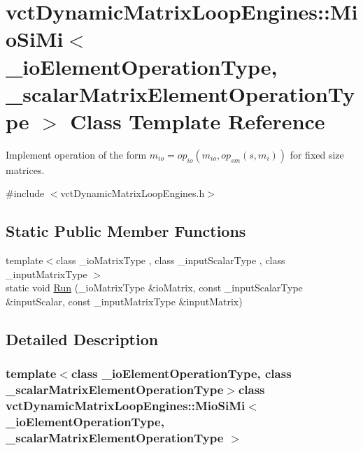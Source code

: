 \hypertarget{classvct_dynamic_matrix_loop_engines_1_1_mio_si_mi}{\section{vct\-Dynamic\-Matrix\-Loop\-Engines\-:\-:Mio\-Si\-Mi$<$ \-\_\-io\-Element\-Operation\-Type, \-\_\-scalar\-Matrix\-Element\-Operation\-Type $>$ Class Template Reference}
\label{classvct_dynamic_matrix_loop_engines_1_1_mio_si_mi}
}


Implement operation of the form $m_{io} = op_{io}(m_{io}, op_{sm}(s, m_i))$ for fixed size matrices.  




{\ttfamily \#include $<$vct\-Dynamic\-Matrix\-Loop\-Engines.\-h$>$}

\subsection*{Static Public Member Functions}
\begin{DoxyCompactItemize}
\item 
{\footnotesize template$<$class \-\_\-io\-Matrix\-Type , class \-\_\-input\-Scalar\-Type , class \-\_\-input\-Matrix\-Type $>$ }\\static void \hyperlink{classvct_dynamic_matrix_loop_engines_1_1_mio_si_mi_a9dc3a8a475d2b6250f254e7236a34731}{Run} (\-\_\-io\-Matrix\-Type \&io\-Matrix, const \-\_\-input\-Scalar\-Type \&input\-Scalar, const \-\_\-input\-Matrix\-Type \&input\-Matrix)
\end{DoxyCompactItemize}


\subsection{Detailed Description}
\subsubsection*{template$<$class \-\_\-io\-Element\-Operation\-Type, class \-\_\-scalar\-Matrix\-Element\-Operation\-Type$>$class vct\-Dynamic\-Matrix\-Loop\-Engines\-::\-Mio\-Si\-Mi$<$ \-\_\-io\-Element\-Operation\-Type, \-\_\-scalar\-Matrix\-Element\-Operation\-Type $>$}

